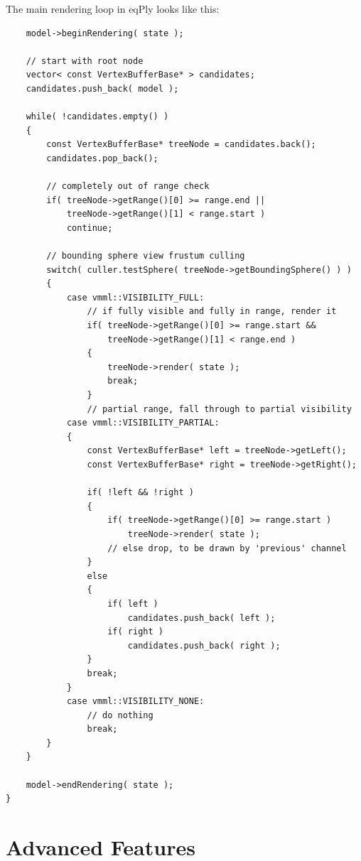 \documentclass[10pt,a4]{scrartcl}
\begin{document}
The main rendering loop in \textsf{eqPly} looks like this:

{\footnotesize\begin{lstlisting}
    model->beginRendering( state );
        
    // start with root node
    vector< const VertexBufferBase* > candidates;
    candidates.push_back( model );
        
    while( !candidates.empty() )
    {
        const VertexBufferBase* treeNode = candidates.back();
        candidates.pop_back();
            
        // completely out of range check
        if( treeNode->getRange()[0] >= range.end || 
            treeNode->getRange()[1] < range.start )
            continue;
            
        // bounding sphere view frustum culling
        switch( culler.testSphere( treeNode->getBoundingSphere() ) )
        {
            case vmml::VISIBILITY_FULL:
                // if fully visible and fully in range, render it
                if( treeNode->getRange()[0] >= range.start && 
                    treeNode->getRange()[1] < range.end )
                {
                    treeNode->render( state );
                    break;
                }
                // partial range, fall through to partial visibility
            case vmml::VISIBILITY_PARTIAL:
            {
                const VertexBufferBase* left = treeNode->getLeft();
                const VertexBufferBase* right = treeNode->getRight();
            
                if( !left && !right )
                {
                    if( treeNode->getRange()[0] >= range.start )
                        treeNode->render( state );
                    // else drop, to be drawn by 'previous' channel
                }
                else
                {
                    if( left )
                        candidates.push_back( left );
                    if( right )
                        candidates.push_back( right );
                }
                break;
            }
            case vmml::VISIBILITY_NONE:
                // do nothing
                break;
        }
    }
        
    model->endRendering( state );
}
\end{lstlisting}}


\section{Advanced Features}
\end{document}

